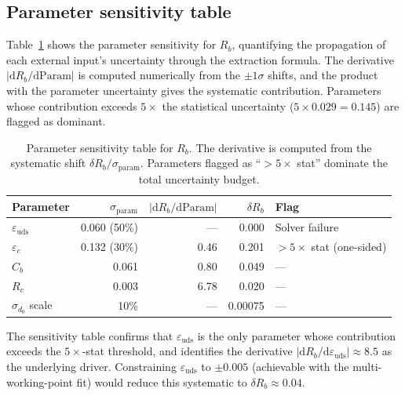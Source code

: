 \documentclass[11pt,a4paper]{article}
\begin{document}
\subsection{Parameter sensitivity table}
\label{sec:sensitivity}

Table~\ref{tab:sensitivity} shows the parameter sensitivity for $R_b$,
quantifying the propagation of each external input's uncertainty through the
extraction formula. The derivative $|\mathrm{d}R_b/\mathrm{d}\mathrm{Param}|$ is
computed numerically from the $\pm 1\sigma$ shifts, and the product with the
parameter uncertainty gives the systematic contribution. Parameters whose
contribution exceeds $5\times$ the statistical uncertainty ($5 \times 0.029 = 0.145$)
are flagged as dominant.

\begin{table}[htbp]
\centering
\caption{Parameter sensitivity table for $R_b$. The derivative is computed from the
systematic shift $\delta R_b / \sigma_\mathrm{param}$. Parameters flagged as
``$> 5\times$ stat'' dominate the total uncertainty budget.}
\label{tab:sensitivity}
\small
\begin{tabular}{lrrrl}
\toprule
Parameter & $\sigma_\mathrm{param}$ & $|\mathrm{d}R_b/\mathrm{d}\mathrm{Param}|$ & $\delta R_b$ & Flag \\
\midrule
$\varepsilon_\mathrm{uds}$ & 0.060 (50\%) & --- & 0.000 & Solver failure \\
$\varepsilon_c$ & 0.132 (30\%) & 0.46 & 0.201 & $> 5\times$ stat (one-sided) \\
$C_b$ & 0.061 & 0.80 & 0.049 & --- \\
$R_c$ & 0.003 & 6.78 & 0.020 & --- \\
$\sigma_{d_0}$ scale & 10\% & --- & 0.00075 & --- \\
\bottomrule
\end{tabular}
\end{table}

The sensitivity table confirms that $\varepsilon_\mathrm{uds}$ is the only parameter
whose contribution exceeds the $5\times$-stat threshold, and identifies the derivative
$|\mathrm{d}R_b/\mathrm{d}\varepsilon_\mathrm{uds}| \approx 8.5$ as the underlying
driver. Constraining $\varepsilon_\mathrm{uds}$ to $\pm 0.005$ (achievable with the
multi-working-point fit) would reduce this systematic to $\delta R_b \approx 0.04$.

\FloatBarrier
{}
\end{document}
